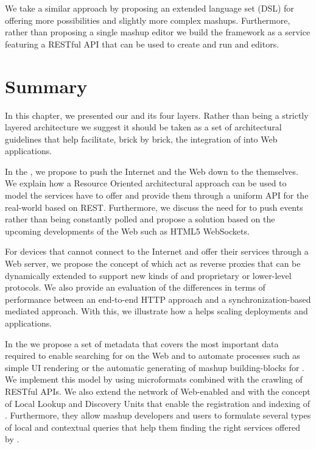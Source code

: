 We take a similar approach by proposing an extended language set (DSL) for \pMashups{} offering more possibilities and slightly more complex mashups. Furthermore, rather than proposing a single mashup editor we build the framework as a service featuring a RESTful API that can be used to create and run \pMashups{} and \pMashup{} editors.


\section{Summary}
In this chapter, we presented our \WoTA{} and its four layers. Rather than being a strictly layered architecture we suggest it should be taken as a set of architectural guidelines that help facilitate, brick by brick, the integration of \sts{} into Web applications.

In the \devLayer{}, we propose to push the Internet and the Web down to the \sts{} themselves. We explain how a Resource Oriented architectural approach can be used to model the services \sts{} have to offer and provide them through a uniform API for the real-world based on REST.
Furthermore, we discuss the need for \sts{} to push events rather than being constantly polled and propose a solution based on the upcoming developments of the Web such as HTML5 WebSockets.

For devices that cannot connect to the Internet and offer their services through a Web server, we propose the concept of \sgs{} which act as reverse proxies that can be dynamically extended to support new kinds of \sts{} and proprietary or lower-level protocols. We also provide an evaluation of the differences in terms of performance between an end-to-end HTTP approach and a synchronization-based \sg{} mediated approach. With this, we illustrate how a \sg{} helps scaling deployments and applications.

In the \findLayer{} we propose a set of metadata that covers the most important data required to enable searching for \sts{} on the Web and to automate processes such as simple UI rendering or the automatic generating of mashup building-blocks for \sts{}. We implement this model by using microformats combined with the crawling of RESTful APIs. We also extend the network of Web-enabled \sts{} and \sg{} with the concept of Local Lookup and Discovery Units that enable the registration and indexing of \sts{}. Furthermore, they allow mashup developers and users to formulate several types of local and contextual queries that help them finding the right services offered by \sts{}.

